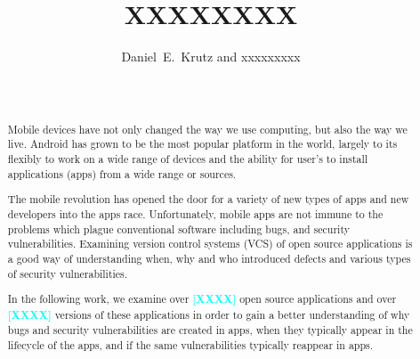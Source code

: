 \documentclass{sig-alternate}
\newcommand{\todo}[1]{\textcolor{cyan}{\textbf{[#1]}}}
\begin{document}

\title{XXXXXXXX}
%
\author{
%
%
\alignauthor
Daniel~E.~Krutz and xxxxxxxxx\\ 	
	\\
       \\
 }

\maketitle
\begin{abstract}

Mobile devices have not only changed the way we use computing, but also the way we live. Android has grown to be the most popular platform in the world, largely to its flexibly to work on a wide range of devices and the ability for user's to install applications (apps) from a wide range or sources. 

The mobile revolution has opened the door for a variety of new types of apps and new developers into the apps race. Unfortunately, mobile apps are not immune to the problems which plague conventional software including bugs, and security vulnerabilities. Examining version control systems (VCS) of open source applications is a good way of understanding when, why and who introduced defects and various types of security vulnerabilities.

In the following work, we examine over \todo{XXXX} open source applications and over \todo{XXXX} versions of these applications in order to gain a better understanding of why bugs and security vulnerabilities are created in apps, when they typically appear in the lifecycle of the apps, and if the same vulnerabilities typically reappear in apps.



\end{abstract}
\end{document}
